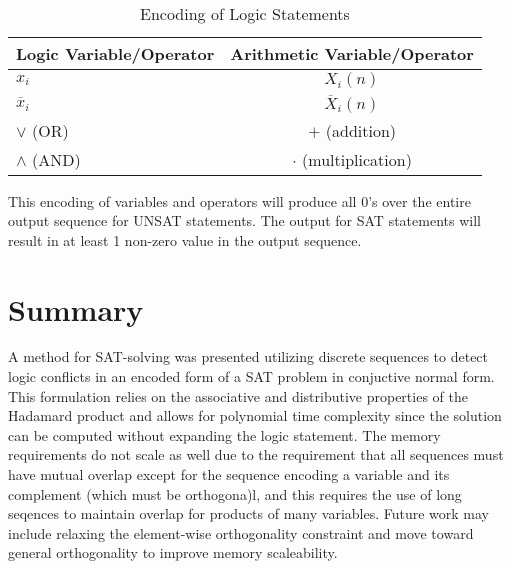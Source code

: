 \documentclass[reqno]{amsart}
\theoremstyle{definition}
\theoremstyle{remark}
\begin{document}
\begin{table}[h]
\centering
\def\arraystretch{1.2}
\begin{tabular}{|l|c|}
\hline
Logic Variable/Operator & Arithmetic Variable/Operator \\
\hline
$x_i$ & $X_i(n)$ \\
\hline
$\overline{x}_i$ & $\overline{X}_i(n)$ \\
\hline
$\vee $ (OR) & $+$ (addition) \\
\hline
$\wedge $ (AND) & $\cdot$ (multiplication) \\
\hline
\end{tabular}
\caption{Encoding of Logic Statements}
\label{tab:template}
\end{table}

\noindent
This encoding of variables and operators will produce all 0's over the entire output sequence 
for UNSAT statements. The output for SAT statements will result in at least 1 non-zero value 
in the output sequence.


\pagebreak
\section{Summary}
\noindent
A method for SAT-solving was presented utilizing discrete sequences to detect logic conflicts in an encoded form of a SAT problem in conjuctive normal form. This formulation relies on the associative and distributive properties of the Hadamard product and allows for polynomial time complexity since the solution can be computed without expanding the logic statement. The memory requirements do not scale as well due to the requirement that all sequences must have mutual overlap except for the sequence encoding a variable and its complement (which must be orthogona)l, and this requires the use of long seqences to maintain overlap for products of many variables. Future work may include relaxing the element-wise orthogonality constraint and move toward general orthogonality to improve memory scaleability.




\end{document}
